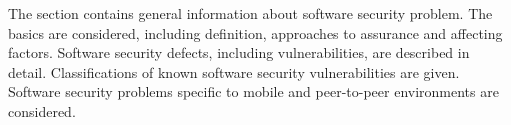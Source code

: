 %
The section contains general information about software security problem. 
%
The basics are considered, including \The definition, approaches to assurance and affecting factors. 
%
Software security defects, including vulnerabilities, are described in detail. 
%
Classifications of known software security vulnerabilities are given. 
%
Software security problems specific to mobile and peer-to-peer environments are considered. 